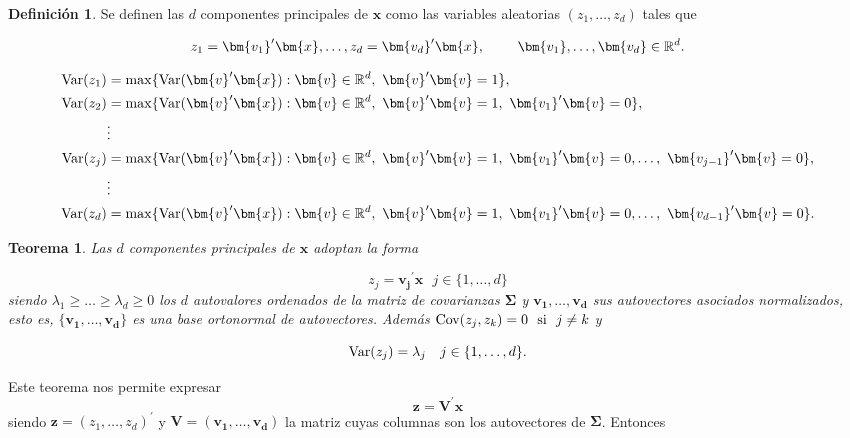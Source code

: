 \documentclass[
  a4paper,
  oneside]{scrbook}
\newtheorem{theorem}{Teorema}[chapter]
\theoremstyle{definition}
\newtheorem{definition}{Definición}[chapter]
\theoremstyle{definition}
\theoremstyle{definition}
\theoremstyle{definition}
\theoremstyle{remark}
\begin{document}
\begin{definition}
\protect\hypertarget{def:unnamed-chunk-77}{}\label{def:unnamed-chunk-77}Se definen las \(d\) componentes principales de \(\bm{x}\) como las
variables aleatorias \((z_1,\ldots,z_d)\) tales que

\[z_1=\bm{v_1}^{\prime}\bm{x},\ldots,z_d=\bm{v_d}^{\prime}\bm{x},\ \ \ \ \ \ \ \bm{v_1},\ldots,\bm{v_d}\in {\Bbb R}^d.\]

\[\begin{aligned}
\textnormal{Var}(z_1)&=\max\{\textnormal{Var}(\bm{v}^{\prime}\bm{x}):\bm{v}\in {\Bbb R}^d,\ \bm{v}^{\prime}\bm{v}=1\}, \\
\textnormal{Var}(z_2)&=\max\{\textnormal{Var}(\bm{v}^{\prime}\bm{x}):\bm{v}\in {\Bbb R}^d,\ \bm{v}^{\prime}\bm{v}=1,\ \bm{v_1}^{\prime}\bm{v}=0\}, \\
&\vdots \\
\textnormal{Var}(z_j)&=\max\{\textnormal{Var}(\bm{v}^{\prime}\bm{x}):\bm{v}\in {\Bbb R}^d,\ \bm{v}^{\prime}\bm{v}=1,
\ \bm{v_1}^{\prime}\bm{v}=0,\ldots,\ \bm{v_{j-1}}^{\prime}\bm{v}=0\}, \\
 &\vdots \\
\textnormal{Var}(z_d)&=\max\{\textnormal{Var}(\bm{v}^{\prime}\bm{x}):\bm{v}\in {\Bbb R}^d,\ \bm{v}^{\prime}\bm{v}=1,
\ \bm{v_1}^{\prime}\bm{v}=0,\ldots,\ \bm{v_{d-1}}^{\prime}\bm{v}=0\}.\end{aligned}\]
\end{definition}

\begin{theorem}
\protect\hypertarget{thm:unnamed-chunk-78}{}\label{thm:unnamed-chunk-78}Las \(d\) componentes principales de \(\bm{x}\) adoptan la forma

\[z_j=\bm{v_j}^{\prime}\bm{x}\ \ \ j\in\{1,\ldots,d\}\] siendo
\(\lambda_1\geq\ldots\geq\lambda_d\geq 0\) los \(d\) autovalores ordenados
de la matriz de covarianzas \(\bm\Sigma\) y \(\bm{v_1},\ldots,\bm{v_d}\) sus
autovectores asociados normalizados, esto es,
\(\{\bm{v_1},\ldots,\bm{v_d}\}\) es una base ortonormal de autovectores.
Además \(\textnormal{Cov}(z_j,z_k)=0\ \ \mbox{si}\ \ j\neq k\) y

\[\textnormal{Var}(z_j)=\lambda_j\ \ \ j\in\{1,\ldots,d\}.\]
\end{theorem}

Este teorema nos permite expresar \[\bm{z}=\bm{V}^{\prime}\bm{x}\]
siendo \(\bm{z}=(z_1,\ldots,z_d)^\prime{}\) y
\(\bm{V}=(\bm{v_1},\ldots,\bm{v_d})\) la matriz cuyas columnas son los
autovectores de \(\bm\Sigma\). Entonces
\end{document}
